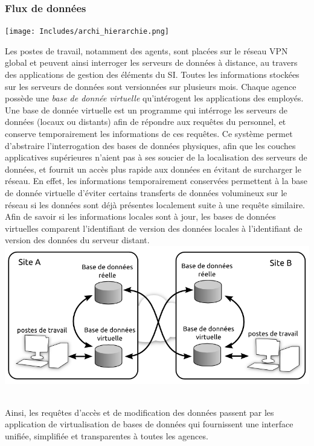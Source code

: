 \documentclass[a4paper]{article}
\begin{document}
\subsubsection{ Flux de données }


\texttt{[image: Includes/archi\_hierarchie.png]}


Les postes de travail, notamment des agents, sont placées sur le réseau VPN global et peuvent ainsi interroger les serveurs de données à distance, au travers des applications de gestion des éléments du SI. Toutes les informations stockées sur les serveurs de données sont versionnées sur plusieurs mois. Chaque agence possède une \textit{base de donnée virtuelle} qu'intérogent les applications des employés.\\
Une base de donnée virtuelle est un programme qui intérroge les serveurs de données (locaux ou distants) afin de répondre aux requêtes du personnel, et conserve temporairement les informations de ces requêtes. Ce système permet d'abstraire l'interrogation des bases de données physiques, afin que les couches applicatives supérieures n'aient pas à ses soucier de la localisation des serveurs de données, et fournit un accès plus rapide aux données en évitant de surcharger le réseau. En effet, les informations temporairement conservées permettent à la base de donnée virtuelle d'éviter certains transferts de données volumineux sur le réseau si les données sont déjà présentes localement suite à une requête similaire. Afin de savoir si les informations locales sont à jour, les bases de données virtuelles comparent l'identifiant de version des données locales à l'identifiant de version des données du serveur distant.\\

\includegraphics{Includes/archi_bddVirtuelle.png}

~\\
Ainsi, les requêtes d'accès et de modification des données passent par les application de virtualisation de bases de données qui fournissent une interface unifiée, simplifiée et transparentes à toutes les agences.
\end{document}
